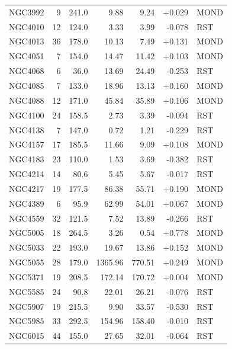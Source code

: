 \documentclass[11pt,a4paper]{article}
\begin{document}
\begin{longtable}{lrrrrrl}
NGC3992              &   9 &  241.0 &     9.88 &     9.24 & +0.029 & MOND \\
NGC4010              &  12 &  124.0 &     3.33 &     3.99 & -0.078 & RST \\
NGC4013              &  36 &  178.0 &    10.13 &     7.49 & +0.131 & MOND \\
NGC4051              &   7 &  154.0 &    14.47 &    11.42 & +0.103 & MOND \\
NGC4068              &   6 &   36.0 &    13.69 &    24.49 & -0.253 & RST \\
NGC4085              &   7 &  133.0 &    18.96 &    13.13 & +0.160 & MOND \\
NGC4088              &  12 &  171.0 &    45.84 &    35.89 & +0.106 & MOND \\
NGC4100              &  24 &  158.5 &     2.73 &     3.39 & -0.094 & RST \\
NGC4138              &   7 &  147.0 &     0.72 &     1.21 & -0.229 & RST \\
NGC4157              &  17 &  185.5 &    11.66 &     9.09 & +0.108 & MOND \\
NGC4183              &  23 &  110.0 &     1.53 &     3.69 & -0.382 & RST \\
NGC4214              &  14 &   80.6 &     5.45 &     5.67 & -0.017 & RST \\
NGC4217              &  19 &  177.5 &    86.38 &    55.71 & +0.190 & MOND \\
NGC4389              &   6 &   95.9 &    62.99 &    54.01 & +0.067 & MOND \\
NGC4559              &  32 &  121.5 &     7.52 &    13.89 & -0.266 & RST \\
NGC5005              &  18 &  264.5 &     3.26 &     0.54 & +0.778 & MOND \\
NGC5033              &  22 &  193.0 &    19.67 &    13.86 & +0.152 & MOND \\
NGC5055              &  28 &  179.0 &  1365.96 &   770.51 & +0.249 & MOND \\
NGC5371              &  19 &  208.5 &   172.14 &   170.72 & +0.004 & MOND \\
NGC5585              &  24 &   90.8 &    22.01 &    26.21 & -0.076 & RST \\
NGC5907              &  19 &  215.5 &     9.90 &    33.57 & -0.530 & RST \\
NGC5985              &  33 &  292.5 &   154.96 &   158.40 & -0.010 & RST \\
NGC6015              &  44 &  155.0 &    27.65 &    32.01 & -0.064 & RST \\

\end{longtable}
\end{document}
